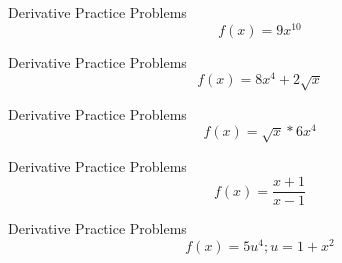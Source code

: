 \documentclass[aspectratio=169]{beamer}
\begin{document}
\begin{frame}{Derivative Practice Problems}\label{main1}
	\vspace{-4cm}
    \[
    f(x) = 9x^{10}
    \]
\end{frame}

\begin{frame}{Derivative Practice Problems}\label{main1}
	\vspace{-4cm}
    \[
    f(x) = 8x^{4} + 2 \sqrt{x}
    \]
\end{frame}

\begin{frame}{Derivative Practice Problems}\label{main1}
	\vspace{-4cm}
    \[
    f(x) = \sqrt{x} * 6x^{4}
    \]
\end{frame}

\begin{frame}{Derivative Practice Problems}\label{main1}
	\vspace{-4cm}
    \[
    f(x) = \frac{x + 1}{x - 1}
    \]
\end{frame}

\begin{frame}{Derivative Practice Problems}\label{main1}
	\vspace{-4cm}
    \[
    f(x) = 5u^{4} ; u = 1 + x^{2}
    \]
\end{frame}
\end{document}

